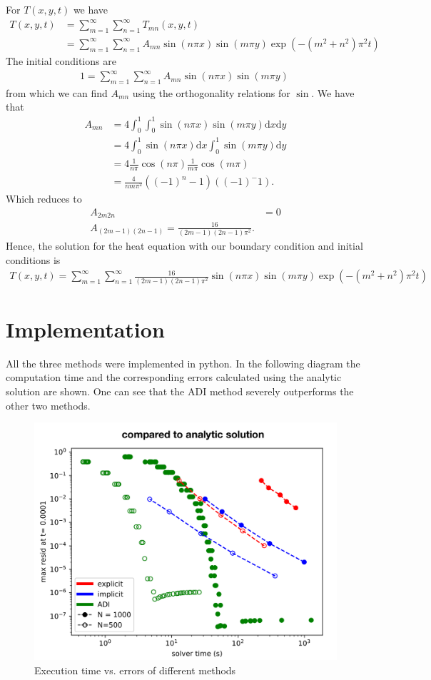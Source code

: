 \documentclass[a4aper,pagesize]{article}
\theoremstyle{definition}
\theoremstyle{plain}
\theoremstyle{remark}
\begin{document}
For $T(x, y, t)$ we have
\begin{align}
    T(x, y, t) &= \sum_{m=1}^\infty\sum_{n=1}^\infty T_{m n}(x, y, t) \\
    &= \sum_{m=1}^\infty\sum_{n=1}^\infty A_{m n}\sin(n\pi  x) \sin(m\pi  y)\exp(-(m^2+ n^2)\pi^2t)
\end{align}
The initial conditions are
\begin{align}
    1 = \sum_{m=1}^\infty\sum_{n=1}^\infty A_{m n}\sin(n\pi  x) \sin(m\pi  y)\
\end{align}
from which we can find $A_{mn}$ using the orthogonality relations for $\sin$. We have that
\begin{align}
    A_{mn} &= 4 \int_0^1 \int_0^1\sin(n\pi  x) \sin(m\pi  y)\mathrm{d}x\mathrm{d}y \\
    &= 4 \int_0^1 \sin(n\pi  x)\mathrm{d}x\int_0^1 \sin(m\pi  y)\mathrm{d}y \\
    &= 4 \frac{1}{n \pi} \cos(n\pi) \frac{1}{m \pi} \cos(m\pi) \\
    &=\frac{4}{nm\pi^2}\left((-1)^n -1\right)\left((-1)^ -1\right).
\end{align}
Which reduces to
\begin{align}
    A_{2m2n} &=0 \\
    A_{(2m-1)(2n-1)} = \frac{16}{(2m-1)(2n-1)\pi^2}.
\end{align}
Hence, the solution for the heat equation with our boundary condition and initial conditions is
\begin{align}
    T(x, y, t) = \sum_{m=1}^\infty\sum_{n=1}^\infty \frac{16}{(2m-1)(2n-1)\pi^2} \sin(n\pi  x) \sin(m\pi  y)\exp(-(m^2+ n^2)\pi^2t)
\end{align}



\section{Implementation}
All the three methods were implemented in python. In the following diagram the computation time and the corresponding errors calculated using the analytic solution are shown. One can see that the ADI method severely outperforms the other two methods.


\begin{figure}[h!]
\centering
	\includegraphics[width = 12cm]{time-err-plot.png}
	\caption{Execution time vs. errors of different methods}
\end{figure}
\end{document}
